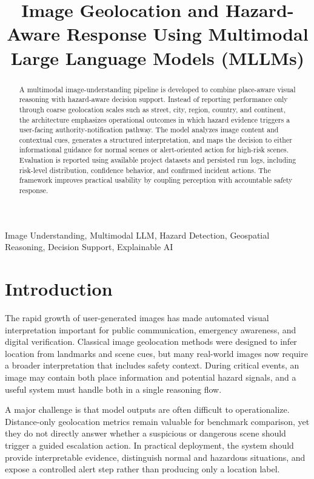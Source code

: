 \documentclass[10pt,conference]{IEEEtran}
\title{Image Geolocation and Hazard-Aware Response Using Multimodal Large Language Models (MLLMs)}
\begin{document}
\maketitle

\begin{abstract}
A multimodal image-understanding pipeline is developed to combine place-aware visual reasoning with hazard-aware decision support. Instead of reporting performance only through coarse geolocation scales such as street, city, region, country, and continent, the architecture emphasizes operational outcomes in which hazard evidence triggers a user-facing authority-notification pathway. The model analyzes image content and contextual cues, generates a structured interpretation, and maps the decision to either informational guidance for normal scenes or alert-oriented action for high-risk scenes. Evaluation is reported using available project datasets and persisted run logs, including risk-level distribution, confidence behavior, and confirmed incident actions. The framework improves practical usability by coupling perception with accountable safety response.
\end{abstract}

\begin{IEEEkeywords}
Image Understanding, Multimodal LLM, Hazard Detection, Geospatial Reasoning, Decision Support, Explainable AI
\end{IEEEkeywords}

\section{Introduction}
The rapid growth of user-generated images has made automated visual interpretation important for public communication, emergency awareness, and digital verification. Classical image geolocation methods were designed to infer location from landmarks and scene cues, but many real-world images now require a broader interpretation that includes safety context. During critical events, an image may contain both place information and potential hazard signals, and a useful system must handle both in a single reasoning flow.

A major challenge is that model outputs are often difficult to operationalize. Distance-only geolocation metrics remain valuable for benchmark comparison, yet they do not directly answer whether a suspicious or dangerous scene should trigger a guided escalation action. In practical deployment, the system should provide interpretable evidence, distinguish normal and hazardous situations, and expose a controlled alert step rather than producing only a location label.
\end{document}
